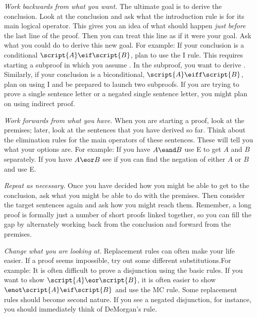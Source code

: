 \emph{Work backwards from what you want.}
The ultimate goal is to derive the conclusion. Look at the conclusion and ask what the introduction rule is for its main logical operator. This gives you an idea of what should happen \emph{just before} the last line of the proof. Then you can treat this line as if it were your goal. Ask what you could do to derive this new goal. For example: If your conclusion is a conditional $\script{A}\eif\script{B}$, plan to use the {\eif}I rule. This requires starting a subproof in which you assume . In the subproof, you want to derive . Similarly, if your conclusion is a biconditional, $\script{A} \eiff \script{B}$, plan on using {\eiff}I and be prepared to launch two subproofs. If you are trying to prove a single sentence letter or a negated single sentence letter, you might plan on using indirect proof. 


\emph{Work forwards from what you have.}
When you are starting a proof, look at the premises; later, look at the sentences that you have derived so far. Think about the elimination rules for the main operators of these sentences. These will tell you what your options are. For example: If you have $A \eand B$ use \eand E to get $A$ and $B$ separately. If you have $A \eor B$ see if you can find the negation of either $A$ or $B$ and use \eor E.

\emph{Repeat as necessary.} Once you have decided how you might be able to get to the conclusion, ask what you might be able to do with the premises. Then consider the target sentences again and ask how you might reach them.  Remember, a long proof is formally just a number of short proofs linked together, so you can fill the gap by alternately working back from the conclusion and forward from the premises.


\emph{Change what you are looking at.} Replacement rules can often make your life easier. If a proof seems impossible, try out some different substitutions.For example: It is often difficult to prove a disjunction using the basic rules. If you want to show $\script{A}\eor\script{B}$, it is often easier to show $\enot\script{A}\eif\script{B}$ and use the MC rule. Some replacement rules should become second nature. If you see a negated disjunction, for instance, you should immediately think of DeMorgan's rule.

